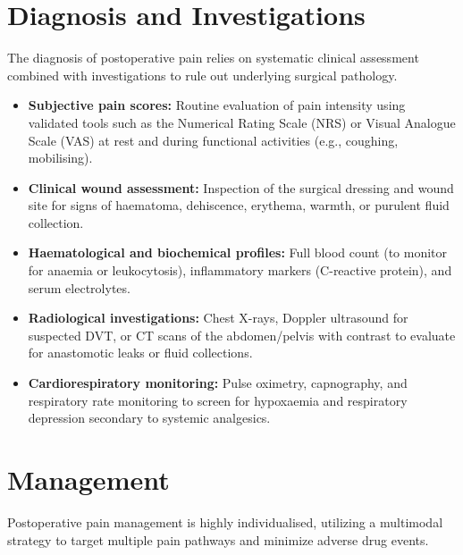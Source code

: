 \section*{Diagnosis and Investigations}
The diagnosis of postoperative pain relies on systematic clinical assessment combined with investigations to rule out underlying surgical pathology.

\begin{itemize}
    \item \textbf{Subjective pain scores:} Routine evaluation of pain intensity using validated tools such as the Numerical Rating Scale (NRS) or Visual Analogue Scale (VAS) at rest and during functional activities (e.g., coughing, mobilising).
    \item \textbf{Clinical wound assessment:} Inspection of the surgical dressing and wound site for signs of haematoma, dehiscence, erythema, warmth, or purulent fluid collection.
    \item \textbf{Haematological and biochemical profiles:} Full blood count (to monitor for anaemia or leukocytosis), inflammatory markers (C-reactive protein), and serum electrolytes.
    \item \textbf{Radiological investigations:} Chest X-rays, Doppler ultrasound for suspected DVT, or CT scans of the abdomen/pelvis with contrast to evaluate for anastomotic leaks or fluid collections.
    \item \textbf{Cardiorespiratory monitoring:} Pulse oximetry, capnography, and respiratory rate monitoring to screen for hypoxaemia and respiratory depression secondary to systemic analgesics.
\end{itemize}

\section*{Management}
Postoperative pain management is highly individualised, utilizing a multimodal strategy to target multiple pain pathways and minimize adverse drug events.

